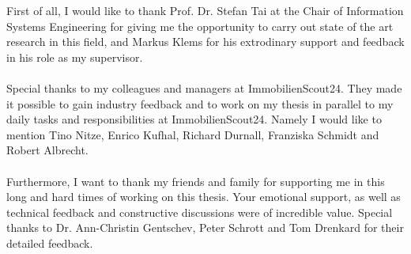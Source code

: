 \thispagestyle{empty}
\vspace*{3cm}

\vspace*{1cm}
\noindent
First of all, I would like to thank Prof. Dr. Stefan Tai at the Chair of Information Systems Engineering for giving me the opportunity to carry out state of the art research in this field, and Markus Klems for his extrodinary support and feedback in his role as my supervisor.
\\
\\
Special thanks to my colleagues and managers at ImmobilienScout24. They made it possible to gain industry feedback and to work on my thesis in parallel to my daily tasks and responsibilities at ImmobilienScout24. Namely I would like to mention Tino Nitze, Enrico Kufhal, Richard Durnall, Franziska Schmidt and Robert Albrecht.
\\
\\
Furthermore, I want to thank my friends and family for supporting me in this long and hard times of working on this thesis. Your emotional support, as well as technical feedback and constructive discussions were of incredible value. Special thanks to Dr. Ann-Christin Gentschev, Peter Schrott and Tom Drenkard for their detailed feedback.
